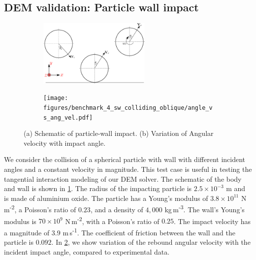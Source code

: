 \documentclass[a4paper,11pt]{book}
\begin{document}
\subsection{DEM validation: Particle wall impact}
\label{sec:DEM_validation_2_particle_wall_impact}
\begin{figure}[!htpb]
  \centering
  \begin{subfigure}{0.48\textwidth}
    \centering
    \includegraphics[width=0.6\textwidth]{images/results_dem_2_validation_particle_wall_impact/schematic}
    \subcaption{
    }\label{fig:result:dem-1a}
  \end{subfigure}
  \begin{subfigure}{0.48\textwidth}
    \centering
    \texttt{[image: figures/benchmark\_4\_sw\_colliding\_oblique/angle\_vs\_ang\_vel.pdf]}
    \subcaption{
    }\label{fig:result:dem-1b}
  \end{subfigure}
  \caption{(a) Schematic of particle-wall impact.  (b)
 Variation of Angular velocity with impact angle.}
\label{fig:result-dem-1}
\end{figure}
We consider the collision of a spherical particle with wall with different
incident angles and a constant velocity in magnitude. This test case is useful
in testing the tangential interaction modeling of our DEM solver.  The schematic
of the body and wall is shown in \cref{fig:result:dem-1a}.  The radius of the
impacting particle is $2.5 \times 10^{-3}$ m and is made of aluminium oxide. The
particle has a Young's modulus of $3.8 \times 10^{11}$ N\,m\textsuperscript{-2}, a
Poisson's ratio of $0.23$, and a density of $4,000$
kg\,m\textsuperscript{-3}. The wall's Young's modulus is $70\times 10^{9}$
N\,m\textsuperscript{-2}, with a Poisson's ratio of $0.25$.  The impact velocity
has a magnitude of $3.9$ m\,s\textsuperscript{-1}. The coefficient of friction
between the wall and the particle is $0.092$.  In
\cref{fig:result:dem-1b}, we show variation of the
rebound angular velocity with the incident impact angle, compared to
experimental data.

\FloatBarrier%
\end{document}
